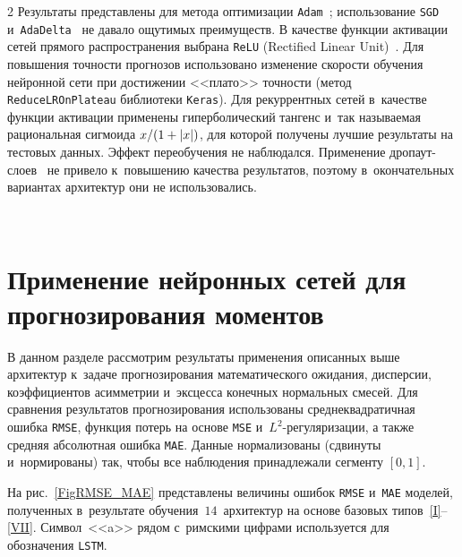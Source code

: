 \begin{multicols}{2}
Результаты представлены для метода оптимизации \verb"Adam"~\cite{Kingma2014}; 
использование \verb"SGD"~\cite{Buduma2017} и~\verb"AdaDelta"~\cite{Zeiler2012} 
не давало ощутимых преимуществ.
В качестве функции активации сетей прямого распространения выбрана \verb"ReLU" 
(Rectified Linear Unit)~\cite{Glorot2011}. Для повышения точ\-ности 
прогнозов использовано изменение скорости обучения нейронной сети 
при достижении <<плато>> точности (метод \verb"ReduceLROnPlateau" 
библиотеки \verb"Keras"). Для рекуррентных сетей в~качестве функции активации 
применены гиперболический тангенс и~так называемая рациональная 
сигмоида $x/(1\hm + |x|)$, для которой получены лучшие результаты
 на тестовых данных. Эффект переобучения не наблюдался. Применение 
 дроп\-аут-сло\-ев~\cite{Srivastava2014} не привело к~повышению качества 
 результатов, поэтому в~окончательных вариантах архитектур они не использовались.
 
 \begin{figure*}[b] %
\vspace*{9pt}
    \begin{center}  
  \mbox{%
 \epsfxsize=107.205mm 
 }
\end{center}
\vspace*{-9pt}
\label{FigRMSE_MAE}
\end{figure*}

\section{Применение нейронных сетей для прогнозирования моментов}

В данном разделе рассмотрим результаты применения описанных выше архитектур 
к~задаче прогнозирования математического ожидания, дис\-пер\-сии, коэффициентов 
асимметрии и~эксцесса\linebreak
 конечных нормальных смесей. Для сравнения результатов 
прогнозирования использованы сред\-не\-квад\-ра\-тич\-ная ошибка \verb"RMSE", 
функция потерь на основе \verb"MSE" и~$L^2$-регуляризации, а также 
средняя абсолютная ошибка \verb"MAE". Данные нормализованы (сдвинуты и~нормированы) 
так, чтобы все наблюдения принадлежали сегменту $[0, 1]$.

На рис.~\ref{FigRMSE_MAE} представлены величины ошибок\linebreak
 \verb"RMSE" и~\verb"MAE" 
моделей, полученных в~результате обучения~$14$~архитектур на основе базовых 
типов~\ref{I}--\ref{VII}. Символ~<<a>> рядом с~римскими цифрами используется 
для обозначения \verb"LSTM".




\end{multicols}
